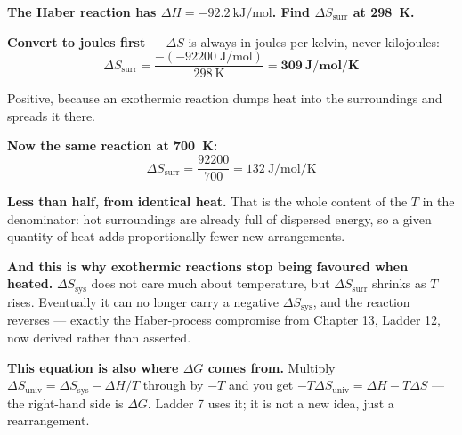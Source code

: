 \documentclass{apchem-worksheet}
\begin{document}
\begin{center}
\end{center}

\begin{workedexample}
\textbf{The Haber reaction has $\Delta H =
\SI{-92.2}{\kilo\joule\per\mole}$. Find $\Delta S_{\text{surr}}$ at
\SI{298}{\kelvin}.}

\textbf{Convert to joules first} --- $\Delta S$ is always in joules per
kelvin, never kilojoules:
\[ \Delta S_{\text{surr}}
   = \frac{-(\num{-92200}\;\si{\joule\per\mole})}{\SI{298}{\kelvin}}
   = \mathbf{\SI{+309}{\joule\per\mole\per\kelvin}} \]

Positive, because an exothermic reaction dumps heat into the
surroundings and spreads it there.

\textbf{Now the same reaction at \SI{700}{\kelvin}:}
\[ \Delta S_{\text{surr}} = \frac{92200}{700}
   = \SI{+132}{\joule\per\mole\per\kelvin} \]

\textbf{Less than half, from identical heat.} That is the whole content
of the $T$ in the denominator: hot surroundings are already full of
dispersed energy, so a given quantity of heat adds proportionally fewer
new arrangements.

\textbf{And this is why exothermic reactions stop being favoured when
heated.} $\Delta S_{\text{sys}}$ does not care much about temperature,
but $\Delta S_{\text{surr}}$ shrinks as $T$ rises. Eventually it can no
longer carry a negative $\Delta S_{\text{sys}}$, and the reaction
reverses --- exactly the Haber-process compromise from Chapter 13,
Ladder 12, now derived rather than asserted.

\textbf{This equation is also where $\Delta G$ comes from.} Multiply
$\Delta S_{\text{univ}} = \Delta S_{\text{sys}} - \Delta H/T$ through by
$-T$ and you get $-T\Delta S_{\text{univ}} = \Delta H - T\Delta S$ ---
the right-hand side is $\Delta G$. Ladder 7 uses it; it is not a new
idea, just a rearrangement.
\end{workedexample}
\end{document}
